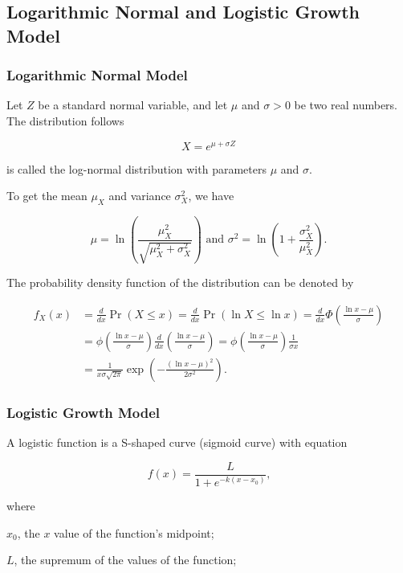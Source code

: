 \documentclass[12pt]{article}
\begin{document}
\subsection{Logarithmic Normal and Logistic Growth Model}

\subsubsection{Logarithmic Normal Model}

Let $Z$ be a standard normal variable, and let $\mu$ and $\sigma>0$ be two real numbers. The distribution follows

$$X=e^{\mu+\sigma Z}$$

\noindent
is called the log-normal distribution with parameters $\mu$ and $\sigma$.

\vspace{0.3cm}
\noindent
To get the mean $\mu_X$ and variance $\sigma_X^2$, we have

$$\mu=\ln\left(\frac{\mu_X^2}{\sqrt{\mu_X^2+\sigma_X^2}}\right) \text{ and } \sigma^2=\ln\left(1+\frac{\sigma_X^2}{\mu_X^2}\right) \text{.}$$

\vspace{0.3cm}
\noindent
The probability density function of the distribution can be denoted by

\begin{align}
    f_X(x)&=\frac{d}{dx}\Pr(X\leq x)=\frac{d}{dx}\Pr(\ln X\leq \ln x)=\frac{d}{dx}\Phi\left(\frac{\ln x-\mu}{\sigma}\right) \nonumber\\
          &=\phi\left(\frac{\ln x - \mu}{\sigma}\right)\frac{d}{dx}\left(\frac{\ln x-\mu}{\sigma}\right)=\phi\left(\frac{\ln x-\mu}{\sigma}\right)\frac{1}{\sigma x} \nonumber\\
          &=\frac{1}{x\sigma\sqrt{2\pi}}\exp\left(-\frac{(\ln x-\mu)^2}{2\sigma^2}\right) \text{.} \nonumber
\end{align}

\subsubsection{Logistic Growth Model}
A logistic function is a S-shaped curve (sigmoid curve) with equation

$$
f(x)=\frac{L}{1+e^{-k(x-x_0)}} \text{,}
$$

\noindent
where

$x_0$, the $x$ value of the function's midpoint;

$L$, the supremum of the values of the function;
\end{document}
